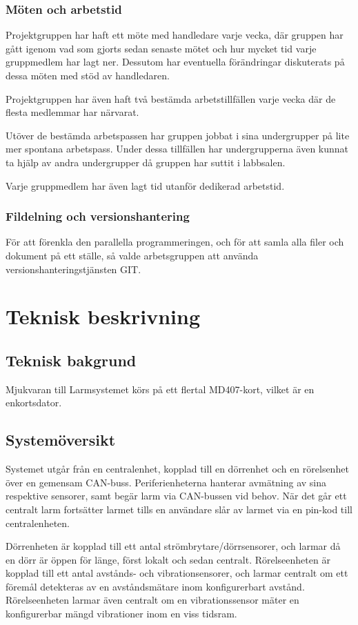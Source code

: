 \documentclass{article}
\begin{document}
\subsubsection{Möten och arbetstid}
Projektgruppen har haft ett möte med handledare varje vecka, där gruppen har gått igenom vad som gjorts sedan senaste mötet och hur mycket tid varje gruppmedlem har lagt ner. Dessutom har eventuella förändringar diskuterats på dessa möten med stöd av handledaren.

Projektgruppen har även haft två bestämda arbetstillfällen varje vecka där de flesta medlemmar har närvarat.

Utöver de bestämda arbetspassen har gruppen jobbat i sina undergrupper på lite mer spontana arbetspass. Under
dessa tillfällen har undergrupperna även kunnat ta hjälp av
andra undergrupper då gruppen har suttit i labbsalen.

Varje gruppmedlem har även lagt tid utanför dedikerad arbetstid.

\subsubsection{Fildelning och versionshantering}
För att förenkla den parallella programmeringen, och för att samla alla filer och dokument på ett ställe, så valde arbetsgruppen att använda versionshanteringstjänsten GIT.


\section{Teknisk beskrivning} %
\subsection{Teknisk bakgrund}
Mjukvaran till Larmsystemet körs på ett flertal MD407-kort, vilket är en enkortsdator.
\subsection{Systemöversikt}

Systemet utgår från en centralenhet, kopplad till en dörrenhet och en rörelsenhet över en gemensam CAN-buss. Periferienheterna hanterar avmätning av sina respektive sensorer, samt begär larm via CAN-bussen vid behov. När det går ett centralt larm fortsätter larmet tills en användare slår av larmet via en pin-kod till centralenheten.

Dörrenheten är kopplad till ett antal strömbrytare/dörrsensorer, och larmar då en dörr är öppen för länge, först lokalt och sedan centralt.
Rörelseenheten är kopplad till ett antal avstånds- och vibrationsensorer, och larmar centralt om ett föremål detekteras av en avståndsmätare inom konfigurerbart avstånd. Rörelseenheten larmar även centralt om en vibrationssensor mäter en konfigurerbar mängd vibrationer inom en viss tidsram. %
\end{document}
